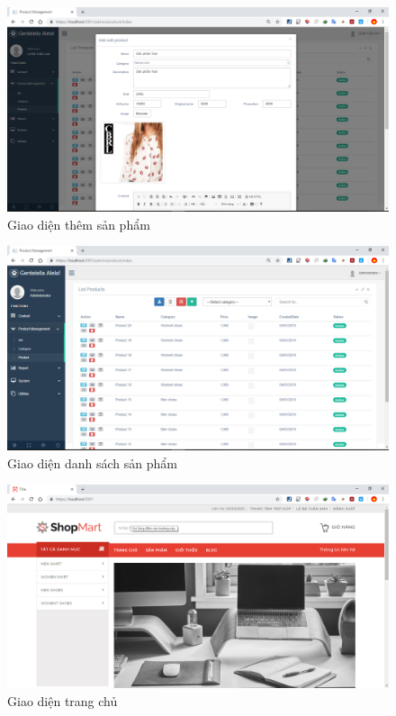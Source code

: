  \begin{center}
    \begin{figure}[h]
    \begin{center}
     \includegraphics[scale=0.45]{image/themSanpham}
    \end{center}
    \caption{Giao diện thêm sản phẩm}
    \label{refhinh4_4}
    \end{figure}
\end{center}

\begin{center}
    \begin{figure}[h]
    \begin{center}
     \includegraphics[scale=0.45]{image/danhsachSP}
    \end{center}
    \caption{Giao diện danh sách sản phẩm}
    \label{refhinh4_5}
    \end{figure}
\end{center}

\begin{center}
    \begin{figure}[h]
    \begin{center}
     \includegraphics[scale=0.45]{image/trangchu}
    \end{center}
    \caption{Giao diện trang chủ}
    \label{refhinh4_6}
    \end{figure}
\end{center}




